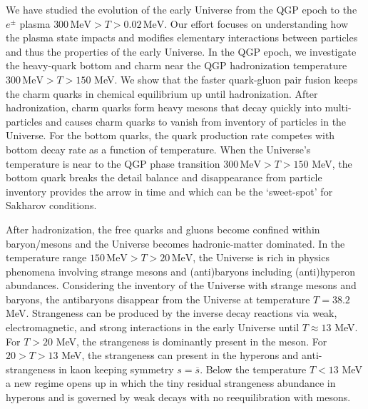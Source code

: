 \label{Summary}
We have studied the evolution of the early Universe from the QGP epoch to the $e^\pm$ plasma $300\,\mathrm{MeV}>T>0.02\,\mathrm{MeV}$. Our effort focuses on understanding how the plasma state impacts and modifies elementary interactions between particles and thus the properties of the early Universe.
In the QGP epoch, 
we investigate the heavy-quark bottom and charm near the QGP hadronization temperature $300\,\mathrm{MeV}>T>150$ MeV. We show that the  faster quark-gluon pair fusion keeps the charm quarks in chemical equilibrium up until hadronization. After hadronization, charm quarks form heavy mesons that decay quickly into multi-particles and causes charm quarks to vanish from inventory of particles in the Universe. For the bottom quarks, the
quark production rate competes with bottom decay rate as a function of temperature. When the Universe's temperature is near to the QGP phase transition $300\,\mathrm{MeV}>T>150$ MeV, the bottom quark breaks the detail balance and disappearance from particle inventory provides the arrow in time and which can be the ‘sweet-spot’ for Sakharov conditions.

After hadronization, the free quarks and gluons become confined within baryon/mesons and the Universe becomes hadronic-matter dominated. In the temperature range $ 150\,\mathrm{MeV}>T>20\,\mathrm{MeV}$, the Universe is rich in physics phenomena involving strange mesons and (anti)baryons including (anti)hyperon abundances. 
Considering the inventory of the Universe  with strange mesons and baryons, the antibaryons disappear from the Universe at temperature $T=38.2$ MeV. Strangeness can be produced by the inverse decay reactions via weak, electromagnetic, and strong interactions in the early Universe until $T\approx13$ MeV. For $T>20$ MeV, the strangeness is dominantly present in the meson. For $20 >T > 13$ MeV, the strangeness can present in the hyperons and anti-strangeness in kaon keeping symmetry $s=\overline{s}$. Below the temperature $T<13$ MeV a new regime opens up in which the tiny residual strangeness abundance in hyperons and is governed by weak decays with no reequilibration with mesons.


